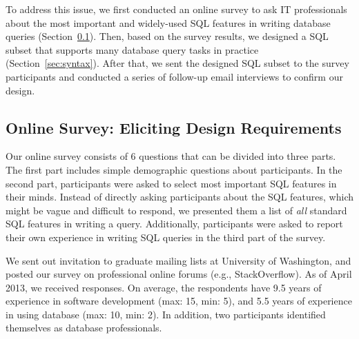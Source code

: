 
To address this issue, we first conducted an online survey
to ask IT professionals about the most important and widely-used
SQL features in writing database queries (Section~\ref{sec:survey}).
Then, based on the survey results, we designed
a SQL subset that supports many database query tasks
in practice (Section~\ref{sec:syntax}).  After that,
we sent the designed SQL subset to the survey participants
and conducted a series of follow-up email interviews
to confirm our design.









\subsection{Online Survey: Eliciting Design Requirements}
\label{sec:survey}


Our online survey consists of 6 questions that can be
divided into three parts. The first part includes
simple demographic questions about participants.
In the second part, participants were asked to select
most important SQL features in their minds.
Instead of directly asking participants about the SQL
features, which might be vague and difficult to respond,
we presented them a list of \textit{all} standard
SQL features in writing a query.
Additionally, participants were asked to report their 
own experience in writing SQL queries in the third part of the survey.



We sent out invitation to graduate mailing lists at
University of Washington, and posted our survey on
professional online forums (e.g., StackOverflow).
As of April 2013, we received \respnum responses.
On average, the respondents have 9.5 years of experience
in software development (max: 15, min: 5),
and 5.5 years of experience in
using database (max: 10, min: 2). In addition, two
participants identified themselves as database professionals.

